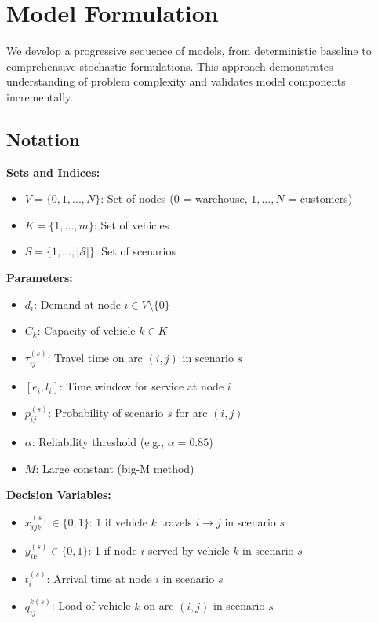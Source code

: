 \section{Model Formulation}
\label{sec:model_formulation}

We develop a progressive sequence of models, from deterministic baseline to comprehensive stochastic formulations. This approach demonstrates understanding of problem complexity and validates model components incrementally.

\subsection{Notation}

\textbf{Sets and Indices:}
\begin{itemize}
\item $V = \{0, 1, ..., N\}$: Set of nodes (0 = warehouse, $1, ..., N$ = customers)
\item $K = \{1, ..., m\}$: Set of vehicles
\item $S = \{1, ..., |\mathcal{S}|\}$: Set of scenarios
\end{itemize}

\textbf{Parameters:}
\begin{itemize}
\item $d_i$: Demand at node $i \in V \setminus \{0\}$
\item $C_k$: Capacity of vehicle $k \in K$
\item $\tau_{ij}^{(s)}$: Travel time on arc $(i,j)$ in scenario $s$
\item $[e_i, l_i]$: Time window for service at node $i$
\item $p_{ij}^{(s)}$: Probability of scenario $s$ for arc $(i,j)$
\item $\alpha$: Reliability threshold (e.g., $\alpha = 0.85$)
\item $M$: Large constant (big-M method)
\end{itemize}

\textbf{Decision Variables:}
\begin{itemize}
\item $x_{ijk}^{(s)} \in \{0,1\}$: 1 if vehicle $k$ travels $i \to j$ in scenario $s$
\item $y_{ik}^{(s)} \in \{0,1\}$: 1 if node $i$ served by vehicle $k$ in scenario $s$
\item $t_i^{(s)}$: Arrival time at node $i$ in scenario $s$
\item $q_{ij}^{k(s)}$: Load of vehicle $k$ on arc $(i,j)$ in scenario $s$
\end{itemize}

